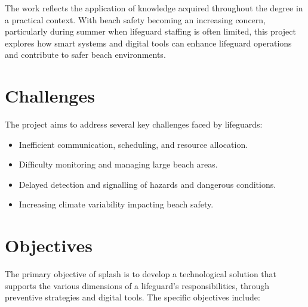 The work reflects the application of knowledge acquired throughout the degree in a practical context. With beach safety becoming an increasing concern, particularly during summer when lifeguard staffing is often limited, this project explores how smart systems and digital tools can enhance lifeguard operations and contribute to safer beach environments.

\section{Challenges}
\label{section:challenges}

The project aims to address several key challenges faced by lifeguards:

\begin{itemize}
    \item Inefficient communication, scheduling, and resource allocation.
    \item Difficulty monitoring and managing large beach areas.
    \item Delayed detection and signalling of hazards and dangerous conditions.
    \item Increasing climate variability impacting beach safety.
\end{itemize}

\section{Objectives}
\label{section:objectives}

The primary objective of \ac{splash} is to develop a technological solution that supports the various dimensions of a lifeguard's responsibilities, through preventive strategies and digital tools. The specific objectives include:

